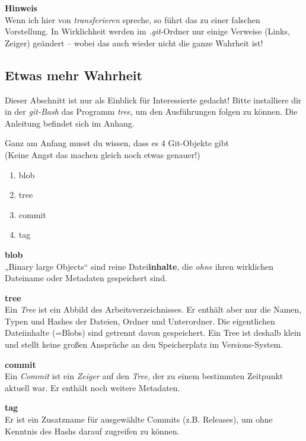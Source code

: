 \documentclass[
  ngerman,
  letterpaper,
  DIV=11]{scrreprt}
\providecommand{\tightlist}{%
  \setlength{\itemsep}{0pt}\setlength{\parskip}{0pt}}
\newcommand{\gitbash}{\textit{git-Bash}\xspace}
\begin{document}
\samplestart

\textbf{Hinweis}\\
Wenn ich hier von \emph{transferieren} spreche, so führt das zu einer
falschen Vorstellung. In Wirklichkeit werden im \emph{.git}-Ordner nur
einige Verweise (Links, Zeiger) geändert -- wobei das auch wieder nicht
die ganze Wahrheit ist! \sampleend

\subsection{Etwas mehr Wahrheit}\label{etwas-mehr-wahrheit}

Dieser Abschnitt ist nur als Einblick für Interessierte gedacht! Bitte
installiere dir in der \gitbash das Programm \emph{tree}, um den
Ausführungen folgen zu können. Die Anleitung befindet sich im Anhang.

Ganz am Anfang musst du wissen, dass es 4 Git-Objekte gibt\\
(Keine Angst das machen gleich noch etwas genauer!)

\begin{enumerate}
\def\labelenumi{\arabic{enumi}.}
\tightlist
\item
  blob
\item
  tree
\item
  commit
\item
  tag
\end{enumerate}

\textbf{blob}\\
„Binary large Objects`` sind reine Datei\textbf{inhalte}, die
\emph{ohne} ihren wirklichen Dateiname oder Metadaten gespeichert sind.

\textbf{tree}\\
Ein \emph{Tree} ist ein Abbild des Arbeitsverzeichnisses. Er enthält
aber nur die Namen, Typen und Hashes der Dateien, Ordner und
Unterordner. Die eigentlichen Dateiinhalte (=Blobs) sind getrennt davon
gespeichert. Ein Tree ist deshalb klein und stellt keine großen
Ansprüche an den Speicherplatz im Versions-System.

\textbf{commit}\\
Ein \emph{Commit} ist ein \emph{Zeiger} auf den \emph{Tree}, der zu
einem bestimmten Zeitpunkt aktuell war. Er enthält noch weitere
Metadaten.

\textbf{tag}\\
Er ist ein Zusatzname für ausgewählte Commits (z.B. Releases), um ohne
Kenntnis des Hashs darauf zugreifen zu können.
\end{document}
